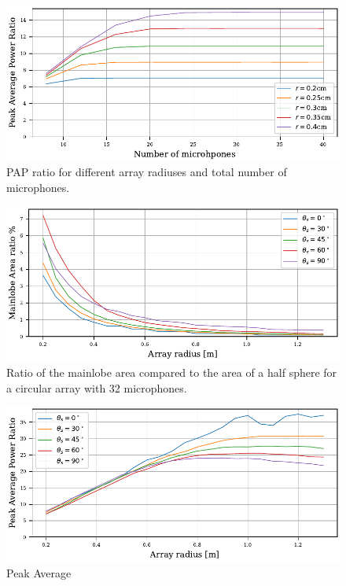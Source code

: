 \begin{figure}
	\centering
	\includegraphics[]{images/5_array_evaluation/circ_m_pap.pdf}
	\caption{PAP ratio for different array radiuses and total number
		of microphones.}
	\label{aev:fig:MicCirc}
\end{figure}
\begin{figure}
	\centering
	\includegraphics[]{images/5_array_evaluation/area_circ.pdf}
	\caption{Ratio of the mainlobe area compared to the area of a half sphere for
		a circular array with 32 microphones.}
	\label{aev:fig:areaCirc}
\end{figure}
\begin{figure}
	\centering
	\includegraphics[]{images/5_array_evaluation/PAP_circ.pdf}
	\caption{Peak Average }
	\label{aev:fig:papCirc}
\end{figure}

